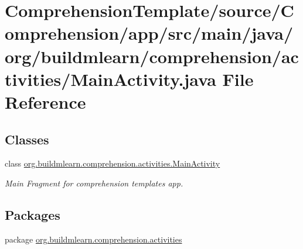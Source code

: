 \hypertarget{ComprehensionTemplate_2source_2Comprehension_2app_2src_2main_2java_2org_2buildmlearn_2comprehense76c71ae58cf792a863238a3f6aaa1de}{}\section{Comprehension\+Template/source/\+Comprehension/app/src/main/java/org/buildmlearn/comprehension/activities/\+Main\+Activity.java File Reference}
\label{ComprehensionTemplate_2source_2Comprehension_2app_2src_2main_2java_2org_2buildmlearn_2comprehense76c71ae58cf792a863238a3f6aaa1de}
\subsection*{Classes}
\begin{DoxyCompactItemize}
\item 
class \hyperlink{classorg_1_1buildmlearn_1_1comprehension_1_1activities_1_1MainActivity}{org.\+buildmlearn.\+comprehension.\+activities.\+Main\+Activity}
\begin{DoxyCompactList}\small\item\em Main Fragment for comprehension template\textquotesingle{}s app. \end{DoxyCompactList}\end{DoxyCompactItemize}
\subsection*{Packages}
\begin{DoxyCompactItemize}
\item 
package \hyperlink{namespaceorg_1_1buildmlearn_1_1comprehension_1_1activities}{org.\+buildmlearn.\+comprehension.\+activities}
\end{DoxyCompactItemize}

